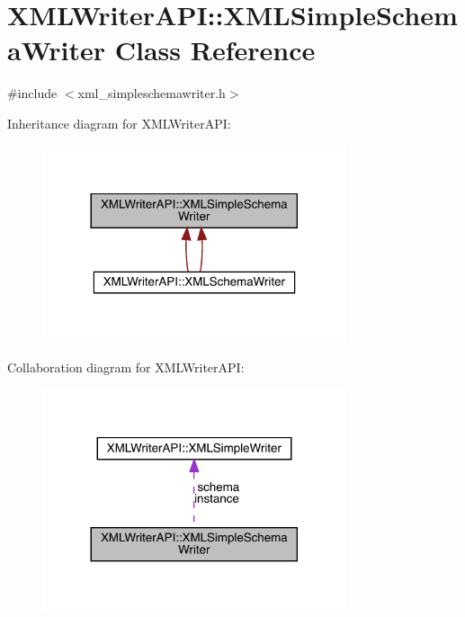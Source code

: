 \hypertarget{classXMLWriterAPI_1_1XMLSimpleSchemaWriter}{}\section{X\+M\+L\+Writer\+A\+PI\+:\+:X\+M\+L\+Simple\+Schema\+Writer Class Reference}
\label{classXMLWriterAPI_1_1XMLSimpleSchemaWriter}


{\ttfamily \#include $<$xml\+\_\+simpleschemawriter.\+h$>$}



Inheritance diagram for X\+M\+L\+Writer\+A\+PI\+:\nopagebreak
\begin{figure}[H]
\begin{center}
\leavevmode
\includegraphics[width=252pt]{d6/d60/classXMLWriterAPI_1_1XMLSimpleSchemaWriter__inherit__graph}
\end{center}
\end{figure}


Collaboration diagram for X\+M\+L\+Writer\+A\+PI\+:\nopagebreak
\begin{figure}[H]
\begin{center}
\leavevmode
\includegraphics[width=252pt]{d0/dd0/classXMLWriterAPI_1_1XMLSimpleSchemaWriter__coll__graph}
\end{center}
\end{figure}
